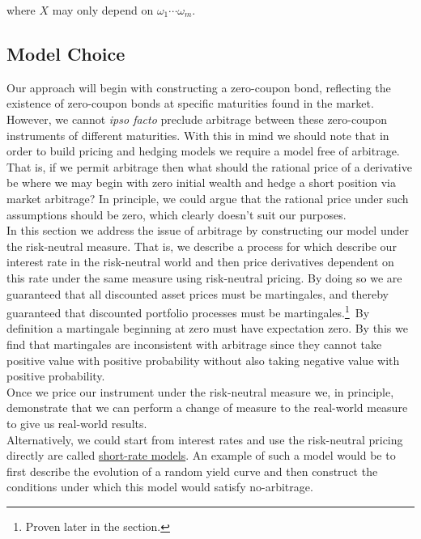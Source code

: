 \documentclass[12pt]{article}
\newlength\tindent
\renewcommand{\indent}{\hspace*{\tindent}}
\begin{document}
where $X$ may only depend on $\omega_1\cdots\omega_m$. \\

\subsection{Model Choice}

\indent Our approach will begin with constructing a zero-coupon bond, reflecting the existence of zero-coupon bonds at specific maturities found in the market. However, we cannot {\em ipso facto} preclude arbitrage between these zero-coupon instruments of different maturities. With this in mind we should note that in order to build pricing and hedging models we require a model free of arbitrage. That is, if we permit arbitrage then what should the rational price of a derivative be where we may begin with zero initial wealth and hedge a short position via market arbitrage? In principle, we could argue that the rational price under such assumptions should be zero, which clearly doesn't suit our purposes. \\

\indent In this section we address the issue of arbitrage by constructing our model under the risk-neutral measure. That is, we describe a process for which describe our interest rate in the risk-neutral world and then price derivatives dependent on this rate under the same measure using risk-neutral pricing. By doing so we are guaranteed that all discounted asset prices must be martingales, and thereby guaranteed that discounted portfolio processes must be martingales.\footnote{Proven later in the section.}~By definition a martingale beginning at zero must have expectation zero. By this we find that martingales are inconsistent with arbitrage since they cannot take positive value with positive probability without also taking negative value with positive probability. \\

\indent Once we price our instrument under the risk-neutral measure we, in principle, demonstrate that we can perform a change of measure to the real-world measure to give us real-world results. \\

\indent Alternatively, we could start from interest rates and use the risk-neutral pricing directly are called \underline{short-rate models}. An example of such a model would be to first describe the evolution of a random yield curve and then construct the conditions under which this model would satisfy no-arbitrage.
\end{document}

